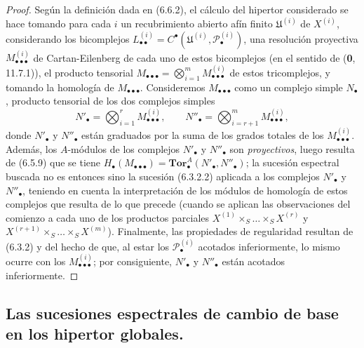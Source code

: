 \documentclass[10pt,oneside,openany]{book}
\theoremstyle{egaenv}\newtheorem*{env}{---}
\theoremstyle{egastatement}
\theoremstyle{egadescription}
\newcommand{\oldpage}[2][]{\marginnote{\normalfont\scriptsize\textbf{#1}\,|\,#2}\ignorespaces}
\begin{document}
\begin{proof}
Según la definición dada en (6.6.2), el cálculo del hipertor considerado se
hace tomando para cada $i$ un recubrimiento abierto afín finito
$\mathfrak U^{(i)}$ de $X^{(i)}$, considerando los bicomplejos
$L_{\bullet\bullet}^{(i)}=C^\bullet(\mathfrak U^{(i)},
\mathscr P_\bullet^{(i)})$, una resolución proyectiva
$M_{\bullet\bullet\bullet}^{(i)}$ de Cartan-Eilenberg de cada uno de estos
bicomplejos (en el sentido de (\textbf{0}, 11.7.1)), el producto tensorial
$M_{\bullet\bullet\bullet}
=\bigotimes_{i=1}^m M_{\bullet\bullet\bullet}^{(i)}$
de estos tricomplejos, y tomando la homología de
$M_{\bullet\bullet\bullet}$. Consideremos $M_{\bullet\bullet\bullet}$ como
un complejo simple $N_\bullet$, producto tensorial de los dos complejos simples
\[
  N'_\bullet=\bigotimes_{i=1}^r M_{\bullet\bullet\bullet}^{(i)},
  \qquad
  N''_\bullet=\bigotimes_{i=r+1}^m M_{\bullet\bullet\bullet}^{(i)},
\]
donde $N'_\bullet$ y $N''_\bullet$ están graduados por la suma de los grados totales
de los $M_{\bullet\bullet\bullet}^{(i)}$. Además, los $A$-módulos de los
complejos $N'_\bullet$ y $N''_\bullet$ son \emph{proyectivos}, luego resulta de
(6.5.9) que se tiene
$H_\bullet(M_{\bullet\bullet\bullet})
=\mathbf{Tor}_\bullet^A(N'_\bullet,N''_\bullet)$;
la sucesión espectral buscada no es entonces sino la sucesión (6.3.2.2)
aplicada a los complejos $N'_\bullet$ y $N''_\bullet$, teniendo en cuenta
la interpretación de los módulos de homología de estos complejos que resulta de lo
que precede (cuando se aplican las observaciones del comienzo a cada uno de los productos
parciales
$X^{(1)}\times_S\ldots\times_S X^{(r)}$ y
$X^{(r+1)}\times_S\ldots\times_S X^{(m)}$). Finalmente, las propiedades de
regularidad resultan de (6.3.2) y del hecho de que, al estar los
$\mathscr P_\bullet^{(i)}$ acotados inferiormente, lo mismo ocurre
con los $M_{\bullet\bullet\bullet}^{(i)}$; por consiguiente, $N'_\bullet$ y
$N''_\bullet$ están acotados inferiormente.
\end{proof}

\oldpage[III]{166}
\subsection{Las sucesiones espectrales de cambio de base en los hipertor
globales.}
\end{document}
